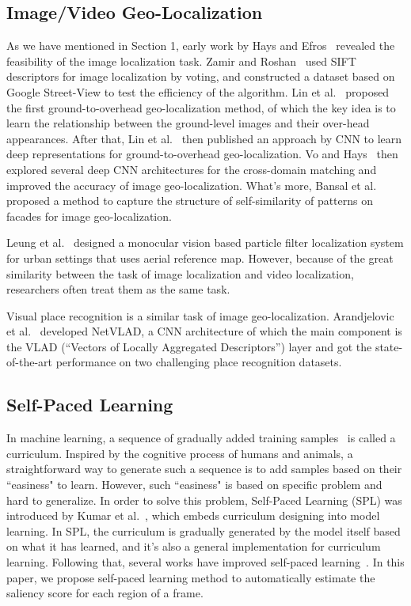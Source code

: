 \subsection{Image/Video Geo-Localization}
\par
As we have mentioned in Section 1, early work by Hays and Efros~\cite{hays2008im2gps} revealed the feasibility of the image localization task. Zamir and Roshan~\cite{zamir2010accurate} used SIFT descriptors for image localization by voting, and constructed a dataset based on Google Street-View to test the efficiency of the algorithm. Lin et al.~\cite{lin2013cross} proposed the first ground-to-overhead geo-localization method, of which the key idea is to learn the relationship between the ground-level images and their over-head appearances. After that, Lin et al.~\cite{lin2015learning} then published an approach by CNN to learn deep representations for ground-to-overhead geo-localization. Vo and Hays~\cite{vo2016localizing} then explored several deep CNN architectures for the cross-domain matching and improved the accuracy of image geo-localization. What's more, Bansal et al.~\cite{bansal2012ultra} proposed a method to capture the structure of self-similarity of patterns on facades for image geo-localization.
\par
Leung et al.~\cite{leung2008localization} designed a monocular vision based particle filter localization system for urban settings that uses aerial reference map. However, because of the great similarity between the task of image localization and video localization, researchers often treat them as the same task.
\par
Visual place recognition is a similar task of image geo-localization. Arandjelovic et al.~\cite{Arandjelovic16} developed NetVLAD, a CNN architecture of which the main component is the VLAD (``Vectors of Locally Aggregated Descriptors'') layer and got the state-of-the-art performance on two challenging place recognition datasets. 

\subsection{Self-Paced Learning}
\par
In machine learning, a sequence of gradually  added training samples~\cite{bengio2009curriculum} is called a curriculum. Inspired by the cognitive process of humans and animals, a straightforward way to generate such a sequence is to add samples based on their ``easiness" to learn. However, such ``easiness" is based on specific problem and hard to generalize. In order to solve this problem, Self-Paced Learning (SPL) was introduced by Kumar et al.~\cite{kumar2010self}, which embeds curriculum designing into model learning. In SPL, the curriculum is gradually generated by the model itself based on what it has learned, and it's also a general implementation for curriculum learning. Following that, several works have improved self-paced learning~\cite{jiang2014easy, tang2012shifting, jiang2014self, jiang2015self}. In this paper, we propose self-paced learning method to automatically estimate the saliency score for each region of a frame.
